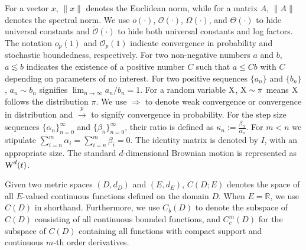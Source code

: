 \documentclass[11pt]{article}
\theoremstyle{plain}
\theoremstyle{definition}
\def\ree{\mathrm{Re}}
\def\ermW{{\textnormal{W}}}
\def\ermX{{\textnormal{X}}}
\def\mI{{\bm{I}}}
\def\CM{{\mathcal C}}
\def\FM{{\mathcal F}}
\def\OM{{\mathcal O}}
\def\RB{{\mathbb R}}
\newcommand{\uu}{{\textnormal{U}}}
\def\mI{{I}}
\def\weakconverge{\Rightarrow}
\begin{document}
For a vector $x$, $\| x \|$ denotes the Euclidean norm, while
for a matrix $A$, $\| A \|$ denotes the spectral norm.
We use $o(\cdot)$, $\OM(\cdot)$, $\Omega(\cdot)$, and $\Theta(\cdot)$ to hide universal constants and $\widetilde{\OM}(\cdot)$ to hide both universal constants and log factors.
The notation $o_p(1)$ and $\OM_p(1)$ indicate convergence in probability and stochastic boundedness, respectively.
For two non-negative numbers $a$ and $b$, $a \lesssim b$ indicates the existence of a positive number $C$ such that $a \le Cb$ with $C$ depending on parameters of no interest.
For two positive sequences $\{ a_n \}$ and $\{ b_n \}$, $a_n \sim b_n$ signifies $\lim_{n \to \infty} a_n / b_n = 1$.
For a random variable $\ermX$, $\ermX \sim \pi$ means $\ermX$ follows the distribution $\pi$.
We use $\weakconverge$ to denote weak convergence or convergence in distribution and $\overset{p}{\rightarrow}$ to signify convergence in probability.
For the step size sequences $\{ \alpha_{n} \}_{n=0}^\infty$ and $\{ \beta_{n} \}_{n=0}^\infty$, their ratio is defined as
$\kappa_{n} := \frac{\beta_{n}}{\alpha_{n}}$.
For $m < n$ we stipulate $\sum_{i=n}^{m} \alpha_{i} = \sum_{i=n}^{m} \beta_{i} = 0 $.
The identity matrix is denoted by $\mI$, with an appropriate size.
The standard $d$-dimensional Brownian motion is represented as $\ermW^d(t)$.

Given two metric spaces $(D, d_D)$ and $(E, d_E)$, $C(D; E)$ denotes the space of all $E$-valued continuous functions defined on the domain $D$. When $E=\mathbb{R}$, we use $C(D)$ in shorthand.
Furthermore, we use $C_b(D)$ to denote the subspace of $C(D)$ consisting of all continuous bounded functions, and $C^m_c(D)$ for the subspace of $C(D)$ containing all functions with compact support and continuous $m$-th order derivatives.
\end{document}
